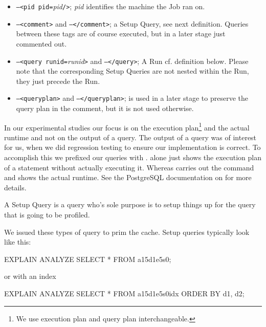 \begin{itemize}
\item 
\texttt{--<pid pid=}\textit{pid}\texttt{/>}; \textit{pid} identifies
the machine the Job ran on.

\item 
\texttt{--<comment>} and \texttt{--</comment>}; a Setup Query, see
next definition. Queries between these tags are of course executed, but
in a later stage just commented out.

\item 
\texttt{--<query runid=}\textit{runid}\texttt{>} and
\texttt{--</query>}; A Run cf. definition below.  Please note that the
corresponding Setup Queries are not nested within the Run, they just
precede the Run.

\item 
\texttt{--<queryplan>} and \texttt{--</queryplan>}; is used in a
later stage to preserve the query plan in the comment, but it is not
used otherwise.
\end{itemize}

In our experimental studies our focus is on the execution
plan\footnote{We use execution plan and query plan interchangeable.}
and the actual runtime and not on the output of a query. The output
of a query was of interest for us, when we did regression testing to
ensure our implementation is correct. To accomplish this we prefixed
our queries with . 
alone just shows the execution plan of a statement without actually
executing it.  Whereas  carries out the command
and shows the actual runtime. See the PostgreSQL documentation on
 for more details.

\begin{definition}
A Setup Query is a query who's sole purpose is to setup things up for
the query that is going to be profiled.
\end{definition}

\noindent
We issued these types of query to prim the cache. Setup queries
typically look like this:

\begin{interactive}
EXPLAIN ANALYZE SELECT * FROM a15d1e5s0;
\end{interactive}

\noindent
or with an index

\begin{interactive}
EXPLAIN ANALYZE SELECT * FROM a15d1e5s0idx ORDER BY d1, d2;
\end{interactive}

